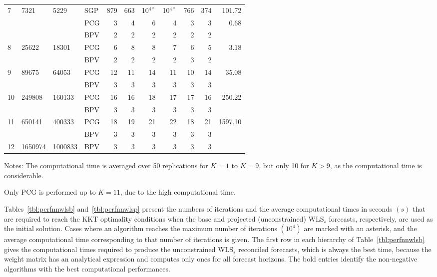\documentclass[11pt]{article}
\newcommand{\0}{\phantom{0}}
\begin{document}
\begin{table}[ht]
\begin{threeparttable}
\begin{tabular}{llllrrrrrrr}
			\midrule
			7 & 7321 & 5229 & SGP & 879 & 663 & 10$^{4*}$ & 10$^{4*}$ & 766 & 374 & 101.72 \\
			& & & PCG & 3 & 4 & 6 & 4 & 3 & 3 & 0.68 \\
			& & & BPV & 2 & 2 & 2 & 2 & 2 & 2 & \bm{$0.57$} \\
			\midrule
			8 & 25622 & 18301 & PCG & 6 & 8 & 8 & 7 & 6 & 5 & 3.18 \\
			& & & BPV & 2 & 2 & 2 & 2 & 3 & 2 & \bm{$1.76$} \\
			\midrule
			9 & 89675 & 64053 & PCG & 12 & 11 & 14 & 11 & 10 & 14 & 35.08 \\
			& & & BPV & 3 & 3 & 3 & 3 & 3 & 3 & \bm{$6.45$} \\
			\midrule
			10 & 249808 & 160133 & PCG & 16 & 16 & 18 & 17 & 17 & 16 & 250.22 \\
			& & & BPV & 3 & 3 & 3 & 3 & 3 & 3 & \bm{$21.00$} \\
			\midrule
			11 & 650141 & 400333 & PCG & 18 & 19 & 21 & 22 & 18 & 21 & 1597.10 \\
			& & & BPV & 3 & 3 & 3 & 3 & 3 & 3 & \bm{$56.84$} \\
			\midrule
			12 & 1650974 & 1000833 & BPV & 3 & 3 & 3 & 3 & 3 & 3 & \bm{$3247.09$}\\
			\bottomrule
		\end{tabular}
		\begin{tablenotes}
			\item [] Notes: The computational time is averaged over 50 replications for $K = 1$ to $K = 9$, but only 10 for $K > 9$, as the computational time is considerable.
			\item [] Only PCG is performed up to $K = 11$, due to the high computational time.
		\end{tablenotes}
	\end{threeparttable}
\end{table}


Tables~\ref{tbl:perfnnwlsb} and~\ref{tbl:perfnnwlsp} present the numbers of iterations and the average computational times in seconds $(s)$ that are required to reach the KKT optimality conditions when the base and projected (unconstrained) WLS$_{s}$ forecasts, respectively, are used as the initial solution. Cases where an algorithm reaches the maximum number of iterations $(10^{4})$ are marked with an asterisk, and the average computational time corresponding to that number of iterations is given. The first row in each hierarchy of Table~\ref{tbl:perfnnwlsb} gives the computational times required to produce the unconstrained WLS$_{s}$ reconciled forecasts, which is always the best time, because the weight matrix has an analytical expression and computes only ones for all forecast horizons. The bold entries identify the non-negative algorithms with the best computational performances.
\end{document}
